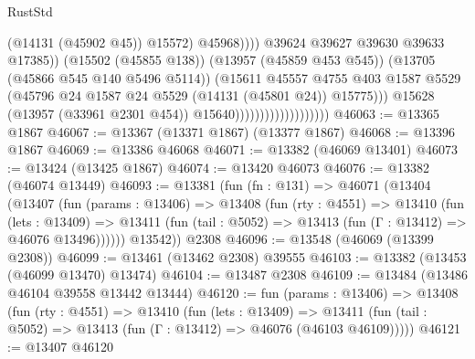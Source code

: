 \begin{lexlean}{RustStd}
\begin{coremodule}
                                                          (@14131 (@45902 @45))
                                                          @15572)
                                                        @45968))))
                                                @39624
                                                @39627
                                                @39630
                                                @39633
                                                @17385))
                                            (@15502 (@45855 @138))
                                            (@13957 (@45859 @453 @545))
                                            (@13705 (@45866 @545 @140 @5496 @5114))
                                            (@15611
                                              @45557
                                              @4755
                                              @403
                                              @1587
                                              @5529
                                              (@45796
                                                @24
                                                @1587
                                                @24
                                                @5529
                                                (@14131 (@45801 @24))
                                                @15775)))
                                          @15628
                                          (@13957 (@33961 @2301 @454))
                                          @15640)))))))))))))))))))
@46063 := @13365 @1867
@46067 := @13367 (@13371 @1867) (@13377 @1867)
@46068 := @13396 @1867
@46069 := @13386 @46068
@46071 := @13382 (@46069 @13401)
@46073 := @13424 (@13425 @1867)
@46074 := @13420 @46073
@46076 := @13382 (@46074 @13449)
@46093 := @13381
    (fun (fn : @131) =>
    @46071
      (@13404
        (@13407
          (fun (params : @13406) =>
          @13408
            (fun (rty : @4551) =>
            @13410
              (fun (lets : @13409) =>
              @13411 (fun (tail : @5052) => @13413 (fun (Γ : @13412) => @46076 @13496))))))
        @13542))
    @2308
@46096 := @13548 (@46069 (@13399 @2308))
@46099 := @13461 (@13462 @2308) @39555
@46103 := @13382 (@13453 (@46099 @13470) @13474)
@46104 := @13487 @2308
@46109 := @13484 (@13486 @46104 @39558 @13442 @13444)
@46120 := fun (params : @13406) =>
  @13408
    (fun (rty : @4551) =>
    @13410
      (fun (lets : @13409) =>
      @13411 (fun (tail : @5052) => @13413 (fun (Γ : @13412) => @46076 (@46103 @46109)))))
@46121 := @13407 @46120

\end{coremodule}
\end{lexlean}
